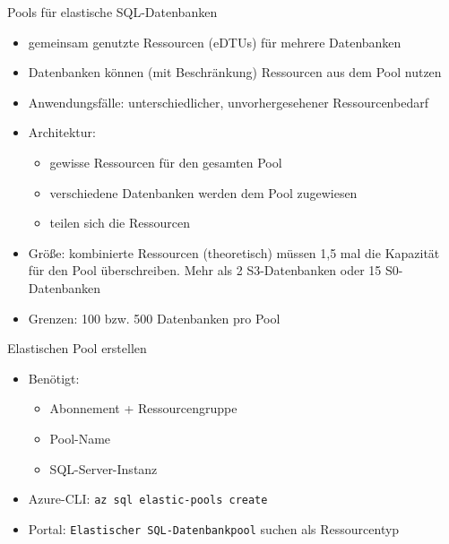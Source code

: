 
\begin{flashcard}[Definition]{Pools für elastische SQL-Datenbanken}
    \begin{itemize}
        \item gemeinsam genutzte Ressourcen (eDTUs) für mehrere Datenbanken
        \item Datenbanken können (mit Beschränkung) Ressourcen aus dem Pool nutzen
        \item Anwendungsfälle: unterschiedlicher, unvorhergesehener Ressourcenbedarf
        \item Architektur:
            \begin{itemize}
                \item gewisse Ressourcen für den gesamten Pool
                \item verschiedene Datenbanken werden dem Pool zugewiesen
                \item[$\Rightarrow$] teilen sich die Ressourcen
            \end{itemize}
        \item Größe: kombinierte Ressourcen (theoretisch) müssen 1,5 mal die Kapazität für den Pool überschreiben. Mehr als 2 S3-Datenbanken oder 15 S0-Datenbanken
        \item Grenzen: 100 bzw. 500 Datenbanken pro Pool
    \end{itemize}
\end{flashcard}

\begin{flashcard}[Definition]{Elastischen Pool erstellen}
    \begin{itemize}
        \item Benötigt:
            \begin{itemize}
                \item Abonnement + Ressourcengruppe
                \item Pool-Name
                \item SQL-Server-Instanz
            \end{itemize}
        \item Azure-CLI:\newline
            \texttt{az sql elastic-pools create}
        \item Portal: \texttt{Elastischer SQL-Datenbankpool} suchen als Ressourcentyp
    \end{itemize}
\end{flashcard}

